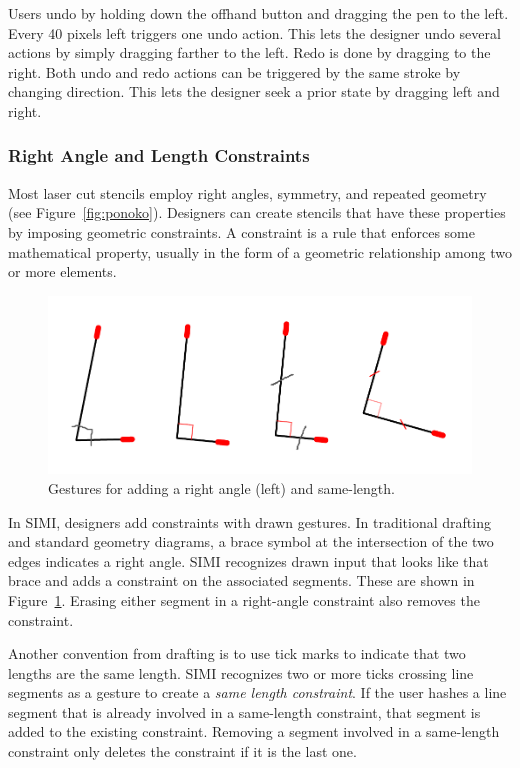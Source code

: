 \documentclass{article}
\begin{document}
Users undo by holding down the offhand button and dragging the pen to
the left. Every 40 pixels left triggers one undo action. This lets the
designer undo several actions by simply dragging farther to the
left. Redo is done by dragging to the right. Both undo and redo
actions can be triggered by the same stroke by changing
direction. This lets the designer seek a prior state by dragging left
and right.

\subsubsection{Right Angle and Length Constraints}

Most laser cut stencils employ right angles, symmetry, and repeated
geometry (see Figure~\ref{fig:ponoko}). Designers can create stencils
that have these properties by imposing geometric constraints. A
constraint is a rule that enforces some mathematical property, usually
in the form of a geometric relationship among two or more
elements.

\begin{figure}[h]
  \centering
  \includegraphics[width=0.9\linewidth]{img/constraints-all.pdf}
  \caption{Gestures for adding a right angle (left) and same-length.}
  \label{fig:constraints}
\end{figure}

In SIMI, designers add constraints with drawn gestures. In traditional
drafting and standard geometry diagrams, a brace symbol at the
intersection of the two edges indicates a right angle. SIMI recognizes
drawn input that looks like that brace and adds a constraint on the
associated segments. These are shown in
Figure~\ref{fig:constraints}. Erasing either segment in a right-angle
constraint also removes the constraint.

Another convention from drafting is to use tick marks to indicate that
two lengths are the same length. SIMI recognizes two or more ticks
crossing line segments as a gesture to create a \textit{same length
  constraint}. If the user hashes a line segment that is already
involved in a same-length constraint, that segment is added to the
existing constraint. Removing a segment involved in a same-length
constraint only deletes the constraint if it is the last one.
\end{document}
